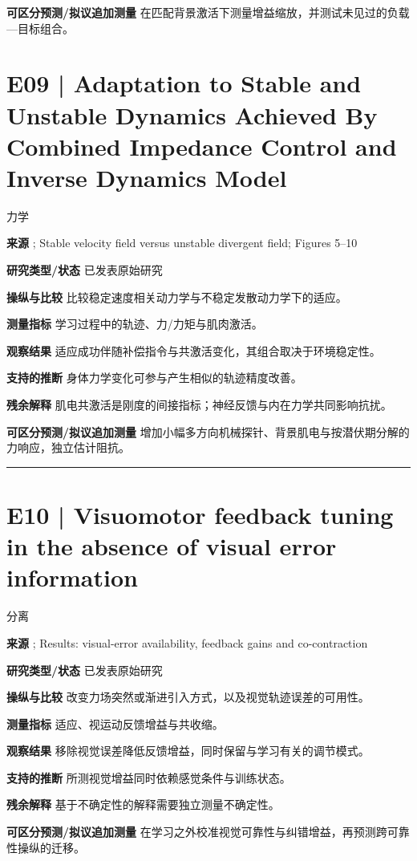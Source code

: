 \documentclass[11pt,a4paper]{article}
\begin{document}
\textbf{可区分预测/拟议追加测量} 在匹配背景激活下测量增益缩放，并测试未见过的负载---目标组合。\par
\clearpage\section{E09 | Adaptation to Stable and Unstable Dynamics Achieved By Combined Impedance Control and Inverse Dynamics Model}
{\small\sffamily\color{navy} 力学}\par
\textbf{来源} \cite{franklin2003}; Stable velocity field versus unstable divergent field; Figures 5--10\par
\textbf{研究类型/状态} 已发表原始研究\par
\textbf{操纵与比较} 比较稳定速度相关动力学与不稳定发散动力学下的适应。\par
\textbf{测量指标} 学习过程中的轨迹、力/力矩与肌肉激活。\par
\textbf{观察结果} 适应成功伴随补偿指令与共激活变化，其组合取决于环境稳定性。\par
\textbf{支持的推断} 身体力学变化可参与产生相似的轨迹精度改善。\par
\textbf{残余解释} 肌电共激活是刚度的间接指标；神经反馈与内在力学共同影响抗扰。\par
\textbf{可区分预测/拟议追加测量} 增加小幅多方向机械探针、背景肌电与按潜伏期分解的力响应，独立估计阻抗。\par
\bigskip\hrule\medskip\section{E10 | Visuomotor feedback tuning in the absence of visual error information}
{\small\sffamily\color{navy} 分离}\par
\textbf{来源} \cite{franklin2023}; Results: visual-error availability, feedback gains and co-contraction\par
\textbf{研究类型/状态} 已发表原始研究\par
\textbf{操纵与比较} 改变力场突然或渐进引入方式，以及视觉轨迹误差的可用性。\par
\textbf{测量指标} 适应、视运动反馈增益与共收缩。\par
\textbf{观察结果} 移除视觉误差降低反馈增益，同时保留与学习有关的调节模式。\par
\textbf{支持的推断} 所测视觉增益同时依赖感觉条件与训练状态。\par
\textbf{残余解释} 基于不确定性的解释需要独立测量不确定性。\par
\textbf{可区分预测/拟议追加测量} 在学习之外校准视觉可靠性与纠错增益，再预测跨可靠性操纵的迁移。\par
\end{document}

